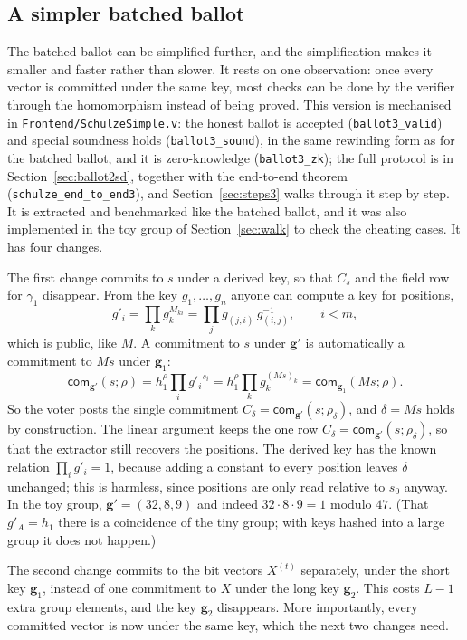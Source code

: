 \documentclass[11pt,a4paper]{article}
\newcommand{\com}{\mathsf{com}}
\newcommand{\rocq}[1]{\texttt{#1}}
\theoremstyle{remark}
\begin{document}
\subsection{A simpler batched ballot}\label{sec:ballot2s}
The batched ballot can be simplified further, and the simplification
makes it smaller and faster rather than slower. It rests on one
observation: once every vector is committed under the same key, most
checks can be done by the verifier through the homomorphism instead of
being proved. This version is mechanised in
\rocq{Frontend/SchulzeSimple.v}: the honest ballot is accepted
(\rocq{ballot3\_valid}) and special soundness holds
(\rocq{ballot3\_sound}), in the same rewinding form as for the batched
ballot, and it is zero-knowledge (\rocq{ballot3\_zk}); the full protocol
is in Section~\ref{sec:ballot2sd}, together with the end-to-end theorem
(\rocq{schulze\_end\_to\_end3}), and Section~\ref{sec:steps3} walks
through it step by step. It is extracted and benchmarked like the
batched ballot, and it was also implemented in the toy group of
Section~\ref{sec:walk} to check the cheating cases. It has four changes.

The first change commits to $s$ under a derived key, so that $C_s$ and
the field row for $\gamma_1$ disappear. From the key $g_1, \ldots, g_n$
anyone can compute a key for positions,
\[
  g'_i = \prod_k g_k^{M_{ki}} = \prod_{j} g_{(j,i)}\, g_{(i,j)}^{-1},
  \qquad i < m,
\]
which is public, like $M$. A commitment to $s$ under $\mathbf{g}'$ is
automatically a commitment to $Ms$ under $\mathbf{g}_1$:
\[
  \com_{\mathbf{g}'}(s; \rho) = h_1^{\rho} \prod_i {g'_i}^{s_i} = h_1^{\rho}
  \prod_k g_k^{(Ms)_k} = \com_{\mathbf{g}_1}(Ms; \rho).
\]
So the voter posts the single commitment $C_\delta = \com_{\mathbf{g}'}(s;
\rho_\delta)$, and $\delta = Ms$ holds by construction. The linear
argument keeps the one row $C_\delta = \com_{\mathbf{g}'}(s;
\rho_\delta)$, so that the extractor still recovers the positions. The
derived key has the known relation $\prod_i g'_i = 1$, because adding a
constant to every position leaves $\delta$ unchanged; this is harmless,
since positions are only read relative to $s_0$ anyway. In the toy group,
$\mathbf{g}' = (32, 8, 9)$ and indeed $32 \cdot 8 \cdot 9 = 1$ modulo
$47$. (That $g'_A = h_1$ there is a coincidence of the tiny group; with
keys hashed into a large group it does not happen.)

The second change commits to the bit vectors $X^{(t)}$ separately, under
the short key $\mathbf{g}_1$, instead of one commitment to $X$ under the
long key $\mathbf{g}_2$. This costs $L - 1$ extra group elements, and the
key $\mathbf{g}_2$ disappears. More importantly, every committed vector
is now under the same key, which the next two changes need.
\end{document}
